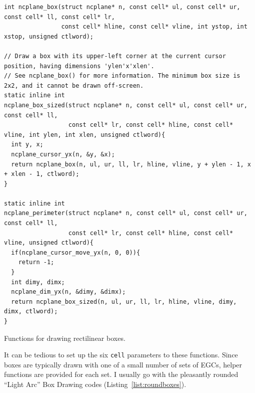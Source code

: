 \documentclass[letterpaper,10pt]{article}
\begin{document}
\begin{listing}[!htb]
\begin{verbatim}
int ncplane_box(struct ncplane* n, const cell* ul, const cell* ur, const cell* ll, const cell* lr,
                const cell* hline, const cell* vline, int ystop, int xstop, unsigned ctlword);

// Draw a box with its upper-left corner at the current cursor position, having dimensions 'ylen'x'xlen'.
// See ncplane_box() for more information. The minimum box size is 2x2, and it cannot be drawn off-screen.
static inline int
ncplane_box_sized(struct ncplane* n, const cell* ul, const cell* ur, const cell* ll,
                  const cell* lr, const cell* hline, const cell* vline, int ylen, int xlen, unsigned ctlword){
  int y, x;
  ncplane_cursor_yx(n, &y, &x);
  return ncplane_box(n, ul, ur, ll, lr, hline, vline, y + ylen - 1, x + xlen - 1, ctlword);
}

static inline int
ncplane_perimeter(struct ncplane* n, const cell* ul, const cell* ur, const cell* ll,
                  const cell* lr, const cell* hline, const cell* vline, unsigned ctlword){
  if(ncplane_cursor_move_yx(n, 0, 0)){
    return -1;
  }
  int dimy, dimx;
  ncplane_dim_yx(n, &dimy, &dimx);
  return ncplane_box_sized(n, ul, ur, ll, lr, hline, vline, dimy, dimx, ctlword);
}
\end{verbatim}
\caption{Functions for drawing rectilinear boxes.}
\label{list:boxes}
\end{listing}

It can be tedious to set up the six \texttt{cell} parameters to these functions. Since
boxes are typically drawn with one of a small number of sets of EGCs, helper functions
are provided for each set. I usually go with the pleasantly rounded ``Light Arc'' Box
Drawing codes (Listing~\ref{list:roundboxes}).
\end{document}
